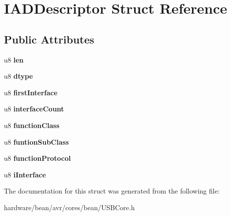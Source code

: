 \hypertarget{struct_i_a_d_descriptor}{}\section{I\+A\+D\+Descriptor Struct Reference}
\label{struct_i_a_d_descriptor}
\subsection*{Public Attributes}
\begin{DoxyCompactItemize}
\item 
\hypertarget{struct_i_a_d_descriptor_ae2d1b72e4763579aae06e0317a24af12}{}u8 {\bfseries len}\label{struct_i_a_d_descriptor_ae2d1b72e4763579aae06e0317a24af12}

\item 
\hypertarget{struct_i_a_d_descriptor_a56dcee7deee6a9ed4bb2e7911d102229}{}u8 {\bfseries dtype}\label{struct_i_a_d_descriptor_a56dcee7deee6a9ed4bb2e7911d102229}

\item 
\hypertarget{struct_i_a_d_descriptor_a4de5e7262e9ae189ead68f66a1d9f0d7}{}u8 {\bfseries first\+Interface}\label{struct_i_a_d_descriptor_a4de5e7262e9ae189ead68f66a1d9f0d7}

\item 
\hypertarget{struct_i_a_d_descriptor_ac2022cc2233dcc739446009ab826f8db}{}u8 {\bfseries interface\+Count}\label{struct_i_a_d_descriptor_ac2022cc2233dcc739446009ab826f8db}

\item 
\hypertarget{struct_i_a_d_descriptor_ae0a20a218b897d1c12b6912143279eba}{}u8 {\bfseries function\+Class}\label{struct_i_a_d_descriptor_ae0a20a218b897d1c12b6912143279eba}

\item 
\hypertarget{struct_i_a_d_descriptor_a394c5ce960da923681cf716d1387f38f}{}u8 {\bfseries funtion\+Sub\+Class}\label{struct_i_a_d_descriptor_a394c5ce960da923681cf716d1387f38f}

\item 
\hypertarget{struct_i_a_d_descriptor_a3397c7e4cd9b3b9369f6712f306862c9}{}u8 {\bfseries function\+Protocol}\label{struct_i_a_d_descriptor_a3397c7e4cd9b3b9369f6712f306862c9}

\item 
\hypertarget{struct_i_a_d_descriptor_a5214f994021a633bb19540e0d21efb14}{}u8 {\bfseries i\+Interface}\label{struct_i_a_d_descriptor_a5214f994021a633bb19540e0d21efb14}

\end{DoxyCompactItemize}


The documentation for this struct was generated from the following file\+:\begin{DoxyCompactItemize}
\item 
hardware/bean/avr/cores/bean/U\+S\+B\+Core.\+h\end{DoxyCompactItemize}
